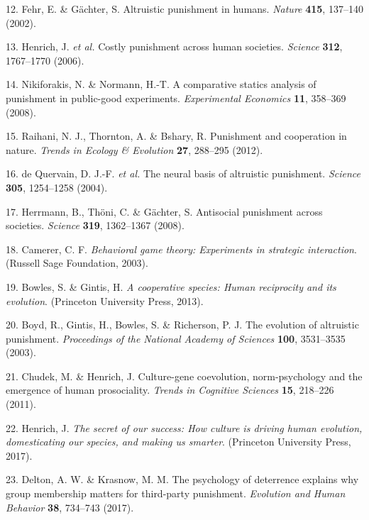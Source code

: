 \documentclass[
  english,
  man, donotrepeattitle,floatsintext]{apa6}
\newenvironment{cslreferences}%
  {}%
  {\par}
\begin{document}
\begin{cslreferences}
\leavevmode\hypertarget{ref-Fehr2002}{}%
12. Fehr, E. \& Gächter, S. Altruistic punishment in humans. \emph{Nature} \textbf{415}, 137--140 (2002).

\leavevmode\hypertarget{ref-Henrich2006}{}%
13. Henrich, J. \emph{et al.} Costly punishment across human societies. \emph{Science} \textbf{312}, 1767--1770 (2006).

\leavevmode\hypertarget{ref-Nikiforakis2008a}{}%
14. Nikiforakis, N. \& Normann, H.-T. A comparative statics analysis of punishment in public-good experiments. \emph{Experimental Economics} \textbf{11}, 358--369 (2008).

\leavevmode\hypertarget{ref-Raihani2012a}{}%
15. Raihani, N. J., Thornton, A. \& Bshary, R. Punishment and cooperation in nature. \emph{Trends in Ecology \& Evolution} \textbf{27}, 288--295 (2012).

\leavevmode\hypertarget{ref-DeQuervain2004}{}%
16. de Quervain, D. J.-F. \emph{et al.} The neural basis of altruistic punishment. \emph{Science} \textbf{305}, 1254--1258 (2004).

\leavevmode\hypertarget{ref-Herrmann2008}{}%
17. Herrmann, B., Thöni, C. \& Gächter, S. Antisocial punishment across societies. \emph{Science} \textbf{319}, 1362--1367 (2008).

\leavevmode\hypertarget{ref-Camerer2003}{}%
18. Camerer, C. F. \emph{Behavioral game theory: Experiments in strategic interaction}. (Russell Sage Foundation, 2003).

\leavevmode\hypertarget{ref-Bowles2013}{}%
19. Bowles, S. \& Gintis, H. \emph{A cooperative species: Human reciprocity and its evolution}. (Princeton University Press, 2013).

\leavevmode\hypertarget{ref-Boyd2003}{}%
20. Boyd, R., Gintis, H., Bowles, S. \& Richerson, P. J. The evolution of altruistic punishment. \emph{Proceedings of the National Academy of Sciences} \textbf{100}, 3531--3535 (2003).

\leavevmode\hypertarget{ref-Chudek2011}{}%
21. Chudek, M. \& Henrich, J. Culture-gene coevolution, norm-psychology and the emergence of human prosociality. \emph{Trends in Cognitive Sciences} \textbf{15}, 218--226 (2011).

\leavevmode\hypertarget{ref-Henrich2017}{}%
22. Henrich, J. \emph{The secret of our success: How culture is driving human evolution, domesticating our species, and making us smarter}. (Princeton University Press, 2017).

\leavevmode\hypertarget{ref-Delton2017}{}%
23. Delton, A. W. \& Krasnow, M. M. The psychology of deterrence explains why group membership matters for third-party punishment. \emph{Evolution and Human Behavior} \textbf{38}, 734--743 (2017).


\end{cslreferences}
\end{document}
